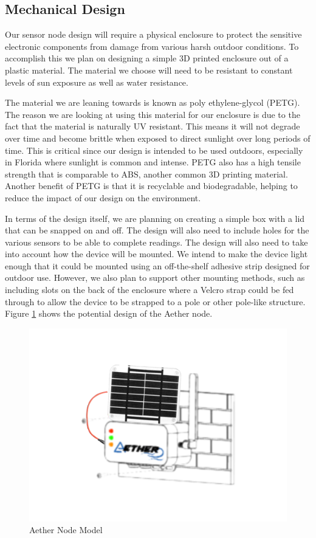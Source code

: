 \subsection{Mechanical Design}
Our sensor node design will require a physical enclosure to protect the sensitive electronic components from damage from various harsh outdoor conditions. To accomplish this we plan on designing a simple 3D printed enclosure out of a plastic material. The material we choose will need to be resistant to constant levels of sun exposure as well as water resistance.

The material we are leaning towards is known as poly ethylene-glycol (PETG). The reason we are looking at using this material for our enclosure is due to the fact that the material is naturally UV resistant. This means it will not degrade over time and become brittle when exposed to direct sunlight over long periods of time. This is critical since our design is intended to be used outdoors, especially in Florida where sunlight is common and intense. PETG also has a high tensile strength that is comparable to ABS, another common 3D printing material. Another benefit of PETG is that it is recyclable and biodegradable, helping to reduce the impact of our design on the environment.

In terms of the design itself, we are planning on creating a simple box with a lid that can be snapped on and off. The design will also need to include holes for the various sensors to be able to complete readings. The design will also need to take into account how the device will be mounted. We intend to make the device light enough that it could be mounted using an off-the-shelf adhesive strip designed for outdoor use. However, we also plan to support other mounting methods, such as including slots on the back of the enclosure where a Velcro strap could be fed through to allow the device to be strapped to a pole or other pole-like structure. Figure \ref{fig:Aether Model} shows the potential design of the Aether node. 

\begin{figure}
    \centering
    \includegraphics[width=5.5in]{figures/Protoype Design.png}
    \caption{Aether Node Model}
    \label{fig:Aether Model} 
\end{figure}